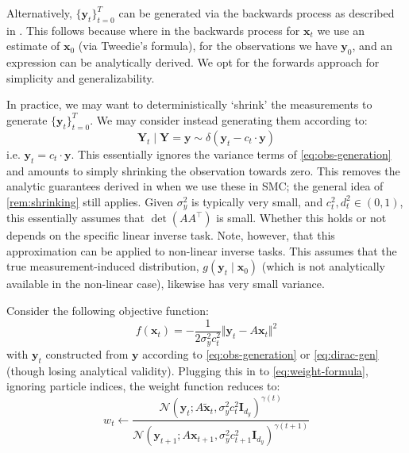 \begin{remark}
    Alternatively, $\{\mathbf{y}_t\}_{t=0}^T$ can be generated via the backwards process as
    described in \textcite{douDiffusionPosteriorSampling2023}. This follows because where in the
    backwards process for $\mathbf{x}_t$ we use an estimate of $\mathbf{x}_0$ (via Tweedie's
    formula), for the observations we have $\mathbf{y}_0$, and an expression can be analytically
    derived. We opt for the forwards approach for simplicity and generalizability.
\end{remark}

\begin{remark} \label{rem:dirac-generation}
    In practice, we may want to deterministically `shrink' the measurements to generate
    $\{\mathbf{y}_t\}_{t=0}^T$. We may consider instead generating them according to:
    \begin{equation}
        \mathbf{Y}_t \mid \mathbf{Y} = \mathbf{y} \sim \delta(\mathbf{y}_t - c_t\cdot \mathbf{y}) \label{eq:dirac-gen}
    \end{equation}
    i.e. $\mathbf{y}_t = c_t\cdot \mathbf{y}$. This essentially ignores the variance terms of
    \ref{eq:obs-generation} and amounts to simply shrinking the observation towards zero.
    This removes the analytic guarantees derived in
    \textcite{douDiffusionPosteriorSampling2023} when we use these in SMC; the general idea of
    \ref{rem:shrinking} still applies. Given $\sigma_y^2$ is typically very small, and
    $c_t^2,d_t^2 \in (0,1)$, this essentially assumes that $\det(AA^\top)$ is small. Whether this
    holds or not depends on the specific linear inverse task. Note, however, that this approximation
    can be applied to non-linear inverse tasks. This assumes that the true measurement-induced
    distribution, $g(\mathbf{y}_t \mid \mathbf{x}_0)$ (which is not analytically available in the
    non-linear case), likewise has very small variance.
\end{remark}

\begin{proposition}
    Consider the following objective function:
    \begin{equation}
        f(\mathbf{x}_t) = -\frac{1}{2\sigma_y^2c_t^2}\Vert\mathbf{y}_t - A\mathbf{x}_t\Vert^2 \label{eq:inverse-objective}
    \end{equation}
    with $\mathbf{y}_t$ constructed from $\mathbf{y}$ according to \ref{eq:obs-generation} or
    \ref{eq:dirac-gen} (though losing analytical validity). Plugging this in to
    \ref{eq:weight-formula}, ignoring particle indices, the weight function reduces to:
    \begin{equation}
        w_t \gets \frac{\mathcal{N}(\mathbf{y}_t; A\tilde{\mathbf{x}}_t, \sigma_y^2c_t^2\mathbf{I}_{d_y})^{\gamma(t)}}{\mathcal{N}(\mathbf{y}_{t+1}; A\mathbf{x}_{t+1}, \sigma_y^2c_{t+1}^2\mathbf{I}_{d_y})^{\gamma(t+1)}} \label{eq:weight-formula-inverse}
    \end{equation}
\end{proposition}

